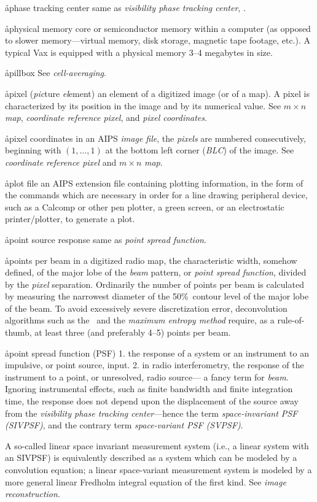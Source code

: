 \aa{phase tracking center}
same as {\it visibility phase tracking center}, \qv.

\aa{physical memory}
core or semiconductor memory within a computer (as opposed
to slower memory---virtual memory, disk storage, magnetic tape footage, etc.).
A typical Vax is equipped with a physical memory 3--4 megabytes in size.

\aa{pillbox}
See {\it cell-averaging}.

\aa{pixel}
({\it pic}\/ture {\it el}\/ement) an element of a digitized image (or of
a map).
A pixel is characterized by its position in the image
and by its numerical value.
See $m\times n$ {\it map}, {\it coordinate reference pixel},
and {\it pixel coordinates}.

\aa{pixel coordinates}
in an AIPS {\it image file}, the {\it pixels} are numbered consecutively,
beginning with $(1,\dots,1)$ at the bottom left corner ({\it BLC}\/)
of the image.
See {\it coordinate reference pixel} and $m\times n$ {\it map}.

\aa{plot file}
an AIPS extension file containing plotting information, in the
form of the commands which are necessary in order for
a line drawing peripheral device, such as a Calcomp or other pen plotter,
a green screen, or an electrostatic printer\slash plotter, to
generate a plot.

\aa{point source response} same as {\it point spread function}.

\aa{points per beam}
in a digitized radio map, the characteristic width, somehow defined,
of the major lobe of the {\it beam} pattern, or {\it point spread function},
divided by the {\it pixel} separation.
Ordinarily the number of points per beam is calculated
by measuring the narrowest diameter of the 50\%\ contour level
of the major lobe of the beam.
To avoid excessively severe discretization error,
deconvolution algorithms such as the
\hca\ and the {\it maximum entropy method}
require, as a rule-of-thumb, at least three (and preferably 4--5)
points per beam.

\aa{point spread function} (PSF)\xspace
1. the response of a system or an instrument to an impulsive,
or point source, input.
\xspace2. in radio interferometry, the response of the instrument to
a point, or unresolved, radio source---%
a fancy term for {\it beam}.
Ignoring instrumental effects, such as finite bandwidth and
finite integration time, the response does not depend upon
the displacement of the source away from the {\it visibility phase
tracking center}\/---hence the term {\it space-invariant PSF
(SIVPSF)}, and the contrary term {\it space-variant PSF (SVPSF)}.
\par
A so-called linear space invariant measurement system (i.e.,
a linear system with an SIVPSF) is equivalently described
as a system which can be modeled by a convolution equation;
a linear space-variant measurement system is modeled
by a more general linear Fredholm integral equation of the first kind.
See {\it image reconstruction}.


